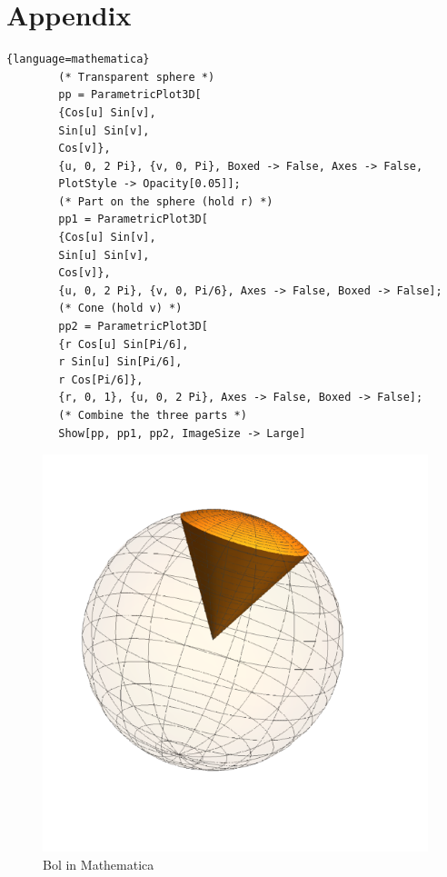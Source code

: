 \documentclass{article}
\begin{document}
    \newpage
    \section{Appendix}\label{sec:appendix}
    \begin{lstlisting}{language=mathematica}
        (* Transparent sphere *)
        pp = ParametricPlot3D[
        {Cos[u] Sin[v],
        Sin[u] Sin[v],
        Cos[v]},
        {u, 0, 2 Pi}, {v, 0, Pi}, Boxed -> False, Axes -> False,
        PlotStyle -> Opacity[0.05]];
        (* Part on the sphere (hold r) *)
        pp1 = ParametricPlot3D[
        {Cos[u] Sin[v],
        Sin[u] Sin[v],
        Cos[v]},
        {u, 0, 2 Pi}, {v, 0, Pi/6}, Axes -> False, Boxed -> False];
        (* Cone (hold v) *)
        pp2 = ParametricPlot3D[
        {r Cos[u] Sin[Pi/6],
        r Sin[u] Sin[Pi/6],
        r Cos[Pi/6]},
        {r, 0, 1}, {u, 0, 2 Pi}, Axes -> False, Boxed -> False];
        (* Combine the three parts *)
        Show[pp, pp1, pp2, ImageSize -> Large]
    \end{lstlisting}
    \begin{figure}[h!]
        \centering
        \includegraphics[width=.5\textwidth]{bol.png}
        \caption{Bol in Mathematica}\label{bolMMa}
    \end{figure}
\end{document}
